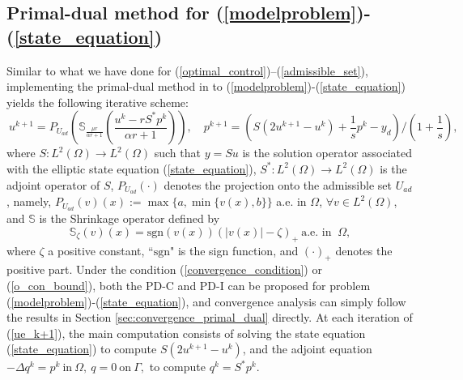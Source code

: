 \documentclass[final]{siamart171218}
\theoremstyle{remark}
\begin{document}
\subsection{Primal-dual method for (\ref{modelproblem})-(\ref{state_equation})}


Similar to what we have done for (\ref{optimal_control})--(\ref{admissible_set}), implementing the primal-dual method in \cite{chambolle2011first} to (\ref{modelproblem})-(\ref{state_equation}) yields the following iterative scheme:
\begin{equation}\label{ue_k+1}
~u^{k+1}=P_{U_{ad}}\left(\mathbb{S}_{\frac{\mu r}{\alpha r+1}}\left(\frac{u^k-rS^*{p}^k}{\alpha r+1}\right)\right),\quad
p^{k+1}=\left(S(2u^{k+1}-u^k)+\frac{1}{s}p^k-y_d\right)/(1+\frac{1}{s}),
\end{equation}
where $S:L^2(\Omega)\rightarrow L^2(\Omega)$ such that $y=Su$ is the solution operator associated with the elliptic state equation (\ref{state_equation}), $S^*: L^2(\Omega)\rightarrow L^2(\Omega)$ is the adjoint operator of $S$, $P_{U_{ad}}(\cdot)$ denotes the projection onto the admissible set $U_{ad}$, namely, $P_{U_{ad}}(v)(x) := \max\{a, \min\{v(x), b\}\}$ a.e. in $\Omega$, $\forall v\in L^2(\Omega)$, and $\mathbb{S}$ is the Shrinkage operator defined by
$$
\mathbb{S}_\zeta(v)(x) = \text{sgn}(v(x)) (|v(x)|-\zeta)_{+}~\text{a.e. in }~\Omega,
$$
where $\zeta$ a positive constant, ``$\text{sgn}$" is the sign function, and $(\cdot)_{+}$ denotes the positive part. Under the condition (\ref{convergence_condition}) or (\ref{o_con_bound}), both the PD-C and PD-I can be proposed for problem (\ref{modelproblem})-(\ref{state_equation}), and convergence analysis can simply follow the results in Section \ref{sec:convergence_primal_dual} directly. At each iteration of (\ref{ue_k+1}), the main computation consists of solving the state equation (\ref{state_equation}) to compute $S(2u^{k+1}-u^k)$, and the adjoint equation
$
-\Delta q^k=p^k~\text{in}~\Omega,~q=0~\text{on}~ \Gamma,
$
to compute $q^k=S^*p^k$.

\end{document}
